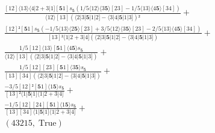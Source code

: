 \documentclass[varwidth, border=5pt]{standalone}
\begin{document}
\begin{my}
$\begin{gathered}
\scriptscriptstyle\frac{[12]⟨13⟩⟨4|2+3|1][𝟓1]s_{𝟓}(1/5⟨12⟩⟨3𝟓⟩[23]-1/5⟨13⟩⟨4𝟓⟩[34])}{⟨12⟩[13](⟨2|3|𝟓|1|2]-⟨3|4|𝟓|1|3])²} +\\
\scriptscriptstyle\frac{[12]²[𝟓1]s_{𝟓}(-1/5⟨13⟩⟨2𝟓⟩[23]+3/5⟨12⟩⟨3𝟓⟩[23]-2/5⟨13⟩⟨4𝟓⟩[34])}{[13]²⟨1|2+3|4](⟨2|3|𝟓|1|2]-⟨3|4|𝟓|1|3])} +\\
\scriptscriptstyle\frac{1/5[12]⟨13⟩[𝟓1]⟨4𝟓⟩s_{𝟓}}{⟨12⟩[13](⟨2|3|𝟓|1|2]-⟨3|4|𝟓|1|3])} +\\
\scriptscriptstyle\frac{1/5[12][23][𝟓1]⟨3𝟓⟩s_{𝟓}}{[13][34](⟨2|3|𝟓|1|2]-⟨3|4|𝟓|1|3])} +\\
\scriptscriptstyle\frac{-3/5[12]²[𝟓1]⟨1𝟓⟩s_{𝟓}}{[13]²⟨1|𝟓|1]⟨1|2+3|4]} +\\
\scriptscriptstyle\frac{-1/5[12][24][𝟓1]⟨1𝟓⟩s_{𝟓}}{[13][34]⟨1|𝟓|1]⟨1|2+3|4]} +\\
\scriptscriptstyle(43215,\;\text{True}) \phantom{+}
\end{gathered}$
\end{my}
\end{document}
